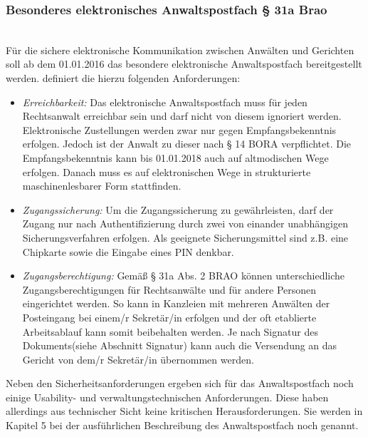 \subsubsection{Besonderes elektronisches Anwaltspostfach § 31a Brao}\hspace*{\fill} \\
Für die sichere elektronische Kommunikation zwischen Anwälten und Gerichten soll ab dem 01.01.2016 das besondere elektronische Anwaltspostfach bereitgestellt werden. \textcite{rechtsvekehranwaltskanzlei} definiert die hierzu folgenden Anforderungen:
\begin{itemize}
\item \textit{Erreichbarkeit:}
Das elektronische Anwaltspostfach muss für jeden Rechtsanwalt erreichbar sein und darf nicht von diesem ignoriert werden. Elektronische Zustellungen werden zwar nur gegen Empfangsbekenntnis erfolgen. Jedoch ist der Anwalt zu dieser nach § 14 BORA verpflichtet. Die Empfangsbekenntnis kann bis 01.01.2018 auch auf altmodischen Wege erfolgen. Danach muss es auf elektronischen Wege in strukturierte maschinenlesbarer Form stattfinden.
\item \textit{Zugangssicherung:}
Um die Zugangssicherung zu gewährleisten, darf der Zugang nur nach Authentifizierung durch zwei von einander unabhängigen Sicherungsverfahren erfolgen. Als geeignete Sicherungsmittel sind z.B. eine Chipkarte sowie die Eingabe eines PIN denkbar.  
\item \textit{Zugangsberechtigung:}
Gemäß § 31a Abs. 2 BRAO können unterschiedliche Zugangsberechtigungen für Rechtsanwälte und für andere Personen eingerichtet werden. So kann in Kanzleien mit mehreren Anwälten der Posteingang bei einem/r Sekretär/in erfolgen und der oft etablierte Arbeitsablauf kann somit beibehalten werden.  Je nach Signatur des Dokuments(siehe Abschnitt Signatur) kann auch die Versendung an das Gericht von dem/r Sekretär/in übernommen werden.
\end{itemize}
Neben den Sicherheitsanforderungen ergeben sich für das Anwaltspostfach noch einige Usability- und verwaltungstechnischen Anforderungen. Diese haben allerdings aus technischer Sicht keine kritischen Herausforderungen. Sie werden in Kapitel 5 bei der ausführlichen Beschreibung des Anwaltspostfach noch genannt.